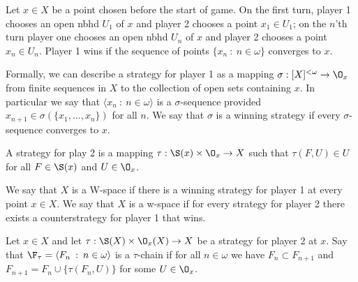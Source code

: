 \documentclass{article}
\begin{document}
Let \(x \in X\) be a point chosen before the start of game. On the first turn, player 1 chooses an open nbhd \(U_1\) of \(x\) and player 2 chooses a point \(x_1 \in U_1\); on the \(n\)'th turn player one chooses an open nbhd \(U_n\) of \(x\) and player 2 chooses a point \(x_n \in U_n\). Player 1 wins if the sequence of points \(\{x_n \: : \: n \in \omega\}\) converges to \(x\).

Formally, we can describe a strategy for player 1 as a mapping \(\sigma: [X]^{<\omega} \to \O_x\) from finite sequences in \(X\) to the collection of open sets containing \(x\). In particular we say that \(\langle x_n \: : \: n \in \omega\rangle\) is a \(\sigma\)-sequence provided \(x_{n + 1} \in \sigma(\{x_1, \dots, x_n\})\) for all \(n\). We say that \(\sigma\) is a winning strategy if every \(\sigma\)-sequence converges to \(x\).

A strategy for play 2 is a mapping \(\tau: \S(x) \times \O_x \to X\) such that \(\tau(F, U) \in U\) for all \(F \in \S(x)\) and \(U \in \O_x\).

\begin{defn}
    We say that \(X\) is a W-space if there is a winning strategy for player 1 at every point \(x \in X\).  We say that \(X\) is a w-space if for every strategy for player 2 there exists a counterstrategy for player 1 that wins.
\end{defn}

\begin{defn}
    Let \(x \in X\) and let \(\tau: \S(X) \times \O_x(X) \to X\) be a strategy for player 2 at \(x\). Say that \(\F_{\tau} = \langle F_n  \: : \: n \in \omega\rangle\) is a \(\tau\)-chain if for all \(n \in \omega\) we have \(F_n \subset F_{n + 1}\) and \(F_{n + 1} = F_n \cup \{\tau(F_n, U)\}\) for some \(U \in \O_x\).
\end{defn}
\end{document}
